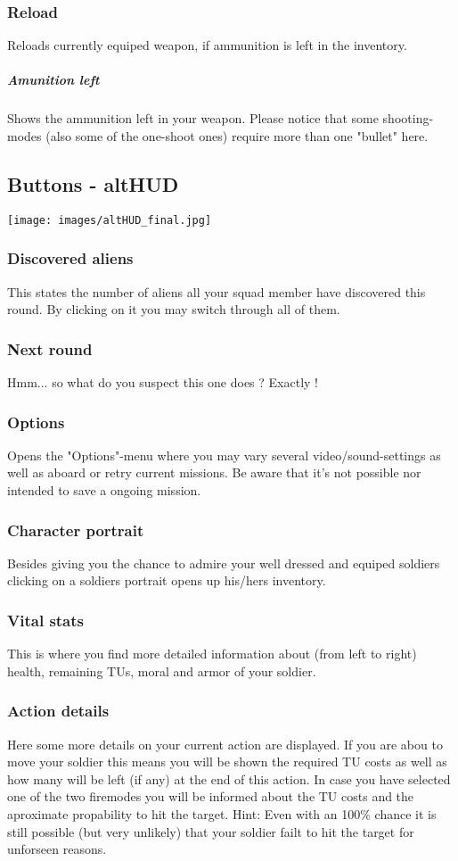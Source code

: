 \subsubsection{Reload}
Reloads currently equiped weapon, if ammunition is left in the inventory.
\subparagraph{Amunition left}
Shows the ammunition left in your weapon. Please notice that some shooting-modes (also some of the one-shoot ones) require more than one "bullet" here.

\subsection{Buttons - altHUD}

\texttt{[image: images/altHUD\_final.jpg]}\\

\subsubsection{Discovered aliens}
This states the number of aliens all your squad member have discovered this round. By clicking on it you may switch through all of them.
\subsubsection{Next round}
Hmm... so what do you suspect this one does ? Exactly !
\subsubsection{Options}
Opens the "Options"-menu where you may vary several video/sound-settings as well as aboard or retry current missions. Be aware that it's not possible nor intended to save a ongoing mission.
\subsubsection{Character portrait}
Besides giving you the chance to admire your well dressed and equiped soldiers clicking on a soldiers portrait opens up his/hers inventory.
\subsubsection{Vital stats}
This is where you find more detailed information about (from left to right) health, remaining TUs, moral and armor of your soldier.
\subsubsection{Action details}
Here some more details on your current action are displayed. If you are abou to move your soldier this means you will be shown the required TU costs as well as how many will be left (if any) at the end of this action. In case you have selected one of the two firemodes you will be informed about the TU costs and the aproximate propability to hit the target. Hint: Even with an 100\% chance it is still possible (but very unlikely) that your soldier failt to hit the target for unforseen reasons.
